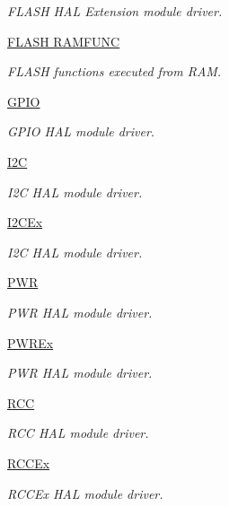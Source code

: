 \begin{DoxyCompactItemize}
\begin{DoxyCompactList}\small\item\em F\+L\+A\+SH H\+AL Extension module driver. \end{DoxyCompactList}\item 
\hyperlink{group___f_l_a_s_h___r_a_m_f_u_n_c}{F\+L\+A\+S\+H R\+A\+M\+F\+U\+NC}
\begin{DoxyCompactList}\small\item\em F\+L\+A\+SH functions executed from R\+AM. \end{DoxyCompactList}\item 
\hyperlink{group___g_p_i_o}{G\+P\+IO}
\begin{DoxyCompactList}\small\item\em G\+P\+IO H\+AL module driver. \end{DoxyCompactList}\item 
\hyperlink{group___i2_c}{I2C}
\begin{DoxyCompactList}\small\item\em I2C H\+AL module driver. \end{DoxyCompactList}\item 
\hyperlink{group___i2_c_ex}{I2\+C\+Ex}
\begin{DoxyCompactList}\small\item\em I2C H\+AL module driver. \end{DoxyCompactList}\item 
\hyperlink{group___p_w_r}{P\+WR}
\begin{DoxyCompactList}\small\item\em P\+WR H\+AL module driver. \end{DoxyCompactList}\item 
\hyperlink{group___p_w_r_ex}{P\+W\+R\+Ex}
\begin{DoxyCompactList}\small\item\em P\+WR H\+AL module driver. \end{DoxyCompactList}\item 
\hyperlink{group___r_c_c}{R\+CC}
\begin{DoxyCompactList}\small\item\em R\+CC H\+AL module driver. \end{DoxyCompactList}\item 
\hyperlink{group___r_c_c_ex}{R\+C\+C\+Ex}
\begin{DoxyCompactList}\small\item\em R\+C\+C\+Ex H\+AL module driver. \end{DoxyCompactList}\item 

\end{DoxyCompactItemize}
